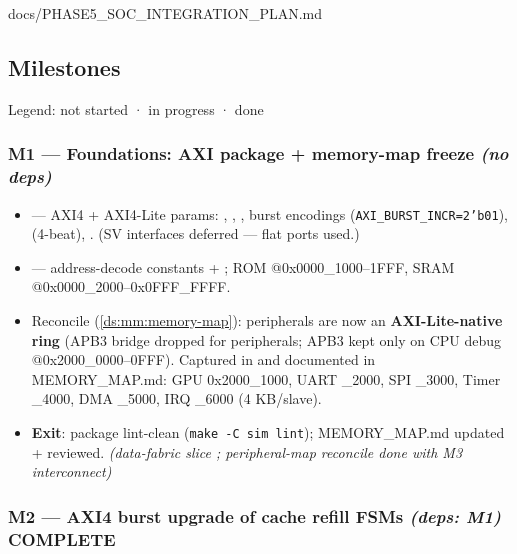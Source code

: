 \begin{relocated}{docs/PHASE5_SOC_INTEGRATION_PLAN.md}
\subsection{Milestones}\label{ds:ch:phase5-soc-integration-plan:3-milestones}

Legend: \hold{} not started · \wip{} in progress · \ok{} done

\subsubsection{\texorpdfstring{M1 --- Foundations: AXI package +
memory-map freeze \emph{(no
deps)}}{M1 --- Foundations: AXI package + memory-map freeze (no deps)}}\label{ds:ch:phase5-soc-integration-plan:m1-foundations-axi-package-memory-map-freeze-no-deps}

\begin{itemize}
\tightlist
\item
  \ok{}  --- AXI4 + AXI4-Lite params:
  , ,
  , burst encodings
  (\texttt{AXI\_\allowbreak{}BURST\_\allowbreak{}INCR=\allowbreak{}2'b01}),
   (4-beat), . (SV interfaces
  deferred --- flat ports used.)
\item
  \ok{}  --- address-decode constants +
  ; ROM @0x0000\_\allowbreak{}1000--1FFF, SRAM
  @0x0000\_\allowbreak{}2000--0x0FFF\_\allowbreak{}FFFF.
\item
  \ok{} Reconcile  (\cref{ds:mm:memory-map}): peripherals are now
  an \textbf{AXI-Lite-native ring} (APB3 bridge dropped for peripherals;
  APB3 kept only on CPU debug @0x2000\_\allowbreak{}0000--0FFF).
  Captured in  and documented in
  MEMORY\_\allowbreak{}MAP.md: GPU 0x2000\_\allowbreak{}1000, UART
  \_2000, SPI \_3000, Timer \_4000, DMA \_5000, IRQ \_6000 (4
  KB/\allowbreak{}slave).
\item
  \textbf{Exit}: package lint-clean
  (\texttt{make\ -\allowbreak{}C\ sim\ lint});
  MEMORY\_\allowbreak{}MAP.md updated + reviewed. \emph{(data-fabric
  slice \ok{}; peripheral-map reconcile \ok{} done with M3
  interconnect)}
\end{itemize}

\subsubsection{\texorpdfstring{M2 --- AXI4 burst upgrade of cache refill
FSMs \emph{(deps: M1)} \ok{}
COMPLETE}{M2 --- AXI4 burst upgrade of cache refill FSMs (deps: M1)  COMPLETE}}\label{ds:ch:phase5-soc-integration-plan:m2-axi4-burst-upgrade-of-cache-refill-fsms-deps-m1-white-check-mark-complete}


\end{relocated}
